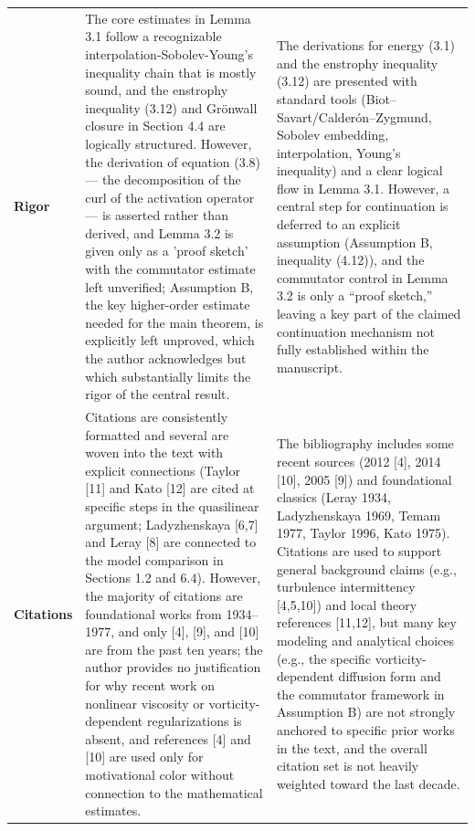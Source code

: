 \documentclass[11pt]{article}
\begin{document}
\begin{longtable}{@{} p{2.2cm} p{6.3cm} p{6.3cm} @{}}
\rowcolor{rowgray}
\textbf{Rigor} &
The core estimates in Lemma 3.1 follow a recognizable interpolation-Sobolev-Young's inequality chain that is mostly sound, and the enstrophy inequality (3.12) and Grönwall closure in Section 4.4 are logically structured. However, the derivation of equation (3.8) — the decomposition of the curl of the activation operator — is asserted rather than derived, and Lemma 3.2 is given only as a 'proof sketch' with the commutator estimate left unverified; Assumption B, the key higher-order estimate needed for the main theorem, is explicitly left unproved, which the author acknowledges but which substantially limits the rigor of the central result. &
The derivations for energy (3.1) and the enstrophy inequality (3.12) are presented with standard tools (Biot–Savart/Calderón–Zygmund, Sobolev embedding, interpolation, Young’s inequality) and a clear logical flow in Lemma 3.1. However, a central step for continuation is deferred to an explicit assumption (Assumption B, inequality (4.12)), and the commutator control in Lemma 3.2 is only a “proof sketch,” leaving a key part of the claimed continuation mechanism not fully established within the manuscript. \\[6pt]

\textbf{Citations} &
Citations are consistently formatted and several are woven into the text with explicit connections (Taylor [11] and Kato [12] are cited at specific steps in the quasilinear argument; Ladyzhenskaya [6,7] and Leray [8] are connected to the model comparison in Sections 1.2 and 6.4). However, the majority of citations are foundational works from 1934–1977, and only [4], [9], and [10] are from the past ten years; the author provides no justification for why recent work on nonlinear viscosity or vorticity-dependent regularizations is absent, and references [4] and [10] are used only for motivational color without connection to the mathematical estimates. &
The bibliography includes some recent sources (2012 [4], 2014 [10], 2005 [9]) and foundational classics (Leray 1934, Ladyzhenskaya 1969, Temam 1977, Taylor 1996, Kato 1975). Citations are used to support general background claims (e.g., turbulence intermittency [4,5,10]) and local theory references [11,12], but many key modeling and analytical choices (e.g., the specific vorticity-dependent diffusion form and the commutator framework in Assumption B) are not strongly anchored to specific prior works in the text, and the overall citation set is not heavily weighted toward the last decade. \\

\end{longtable}
\end{document}
